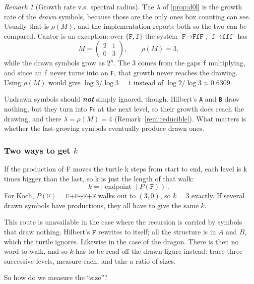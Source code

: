\documentclass[11pt, a4paper]{article}
\theoremstyle{plain}
\theoremstyle{definition}
\theoremstyle{remark}
\newtheorem{remark}[theorem]{Remark}
\begin{document}
\begin{remark}[Growth rate v.s. spectral radius]
\label{rem:undrawn}
    The $\lambda$ of \ref{prop:d0l} is the growth rate of the \emph{drawn}
    symbols, because those are the only ones box counting can see. Usually that
    is $\rho(M)$, and the implementation reports both so the two can be
    compared. Cantor is an exception: over $\{\texttt{F},\texttt{f}\}$ the system
    $\texttt{F}\to\texttt{FfF}$, $\texttt{f}\to\texttt{fff}$ has
    \[
    M=\begin{pmatrix}2&1\\0&3\end{pmatrix},\qquad \rho(M)=3,
    \]
    while the drawn symbols grow as $2^n$. The 3 comes from the
    gaps \texttt{f} multiplying, and since an \texttt{f} never turns into an
    \texttt{F}, that growth never reaches the drawing. Using $\rho(M)$ would
    give $\log3/\log3=1$ instead of $\log2/\log3\approx0.6309$.

    Undrawn symbols should \textbf{\textit{not}} simply ignored, though. Hilbert's \texttt{A} and
    \texttt{B} draw nothing, but they turn into \texttt{F}s at the next level,
    so their growth does reach the drawing, and there $\lambda=\rho(M)=4$
    (Remark~\ref{rem:reducible}). What matters is whether the fast-growing
    symbols eventually produce drawn ones.
\end{remark}

\subsubsection{Two ways to get $k$}
\label{sec:k}

If the production of F moves the turtle k steps from start to end, each level is k times bigger than the last, so k is just the length of that walk:
\[
  k=\bigl|\operatorname{endpoint}(P(\texttt{F}))\bigr|.
\]
For Koch, $P(\texttt{F})=\texttt{F+F-{}-F+F}$ walks out to $(3,0)$, so $k=3$
exactly. If several drawn symbols have productions, they all have to give the same $k$.

This route is unavailable in the case where the recursion is carried by
symbols that draw nothing. Hilbert's $\texttt{F}$ rewrites to itself; all the
structure is in $A$ and $B$, which the turtle ignores. Likewise in the case of the dragon.
There is then no word to walk, and so $k$ has to be read off the drawn figure
instead: trace three successive levels, measure each, and take a ratio of sizes.

So how do we measure the ``size''?
\end{document}
